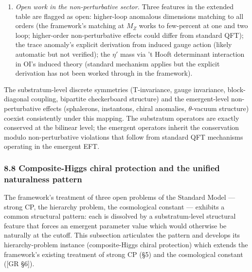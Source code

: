 \documentclass[
]{article}
\begin{document}
\begin{enumerate}
  an added constraint but a structurally automatic feature, consistent
  with the framework's broader pattern of deriving anomaly cancellation
  rather than imposing it.
\item
  \emph{Open work in the non-perturbative sector.} Three features in the
  extended table are flagged as open: higher-loop anomalous dimensions
  matching to all orders (the framework's matching at \(M_Z\) works to
  few-percent at one and two loop; higher-order non-perturbative effects
  could differ from standard QFT); the trace anomaly's explicit
  derivation from induced gauge action (likely automatic but not
  verified); the \(\eta'\) mass via 't Hooft determinant interaction in
  OI's induced theory (standard mechanism applies but the explicit
  derivation has not been worked through in the framework).
\end{enumerate}

The substratum-level discrete symmetries (T-invariance, gauge
invariance, block-diagonal coupling, bipartite checkerboard structure)
and the emergent-level non-perturbative effects (sphalerons, instantons,
chiral anomalies, \(\theta\)-vacuum structure) coexist consistently
under this mapping. The substratum operators are exactly conserved at
the bilinear level; the emergent operators inherit the conservation
modulo non-perturbative violations that follow from standard QFT
mechanisms operating in the emergent EFT.

\hypertarget{composite-higgs-chiral-protection-and-the-unified-naturalness-pattern}{%
\subsubsection{8.8 Composite-Higgs chiral protection and the unified
naturalness
pattern}\label{composite-higgs-chiral-protection-and-the-unified-naturalness-pattern}}

The framework's treatment of three open problems of the Standard Model
--- strong CP, the hierarchy problem, the cosmological constant ---
exhibits a common structural pattern: each is dissolved by a
substratum-level structural feature that forces an emergent parameter
value which would otherwise be naturally at the cutoff. This subsection
articulates the pattern and develops its hierarchy-problem instance
(composite-Higgs chiral protection) which extends the framework's
existing treatment of strong CP (§5) and the cosmological constant
({[}GR §6{]}).
\end{document}
